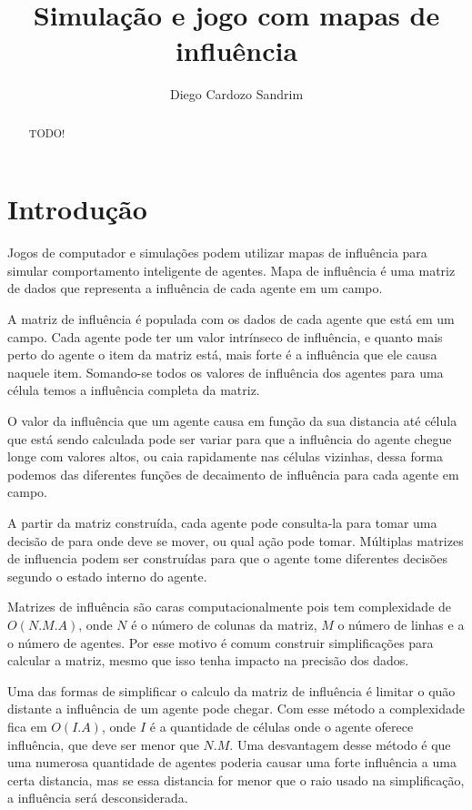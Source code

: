 \documentclass[a4paper]{article}
\title{Simulação e jogo com mapas de influência}
\author{Diego Cardozo Sandrim}
\begin{document}
\maketitle

\begin{abstract}
TODO!
\end{abstract}

\section{Introdução}

Jogos de computador e simulações podem utilizar mapas de influência para simular comportamento inteligente de agentes. Mapa de influência é uma matriz de dados que representa a influência de cada agente em um campo.

A matriz de influência é populada com os dados de cada agente que está em um campo. Cada agente pode ter um valor intrínseco de influência, e quanto mais perto do agente o item da matriz está, mais forte é a influência que ele causa naquele item. Somando-se todos os valores de influência dos agentes para uma célula temos a influência completa da matriz.

O valor da influência que um agente causa em função da sua distancia até célula que está sendo calculada pode ser variar para que a influência do agente chegue longe com valores altos, ou caia rapidamente nas células vizinhas, dessa forma podemos das diferentes funções de decaimento de influência para cada agente em campo.

A partir da matriz construída, cada agente pode consulta-la para tomar uma decisão de para onde deve se mover, ou qual ação pode tomar. Múltiplas matrizes de influencia podem ser construídas para que o agente tome diferentes decisões segundo o estado interno do agente.

Matrizes de influência são caras computacionalmente pois tem complexidade de $O(N.M.A)$, onde $N$ é o número de colunas da matriz, $M$ o número de linhas e a o número de agentes. Por esse motivo é comum construir simplificações para calcular a matriz, mesmo que isso tenha impacto na precisão dos dados.

Uma das formas de simplificar o calculo da matriz de influência é limitar o quão distante a influência de um agente pode chegar. Com esse método a complexidade fica em $O(I.A)$, onde $I$ é a quantidade de células onde o agente oferece influência, que deve ser menor que $N.M$. Uma desvantagem desse método é que uma numerosa quantidade de agentes poderia causar uma forte influência a uma certa distancia, mas se essa distancia for menor que o raio usado na simplificação, a influência será desconsiderada.
\end{document}
